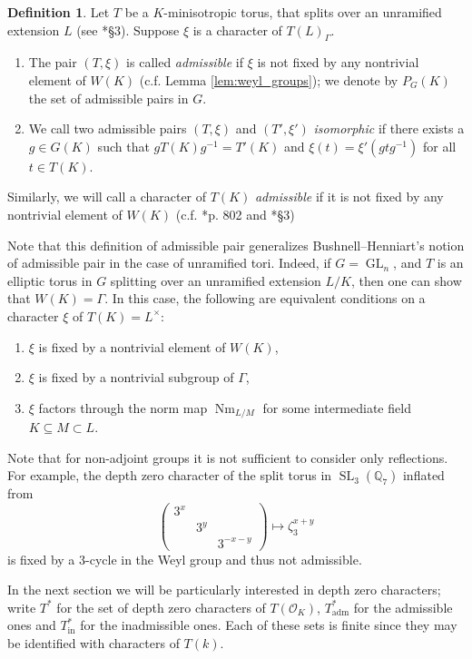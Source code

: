 \documentclass{mrlart7}
\theoremstyle{plain}
\theoremstyle{definition}
\newtheorem{definition}[theorem]{Definition}
\numberwithin{equation}{section}
\DeclareMathOperator{\Nm}{Nm}
\DeclareMathOperator{\GL}{GL}
\DeclareMathOperator{\SL}{SL}
\newcommand{\OK}{\mathcal{O}_K}
\newcommand{\QQ}{\mathbb{Q}}
\newcommand{\Lx}{L^\times}
\newcommand{\Thadm}{T^*_{\operatorname{adm}}}
\newcommand{\Thinadm}{T^*_{\operatorname{in}}}
\newcommand{\hatT}{T^*}
\begin{document}
\begin{definition} \label{def:admissible}
Let $T$ be a $K$-minisotropic torus, that splits over an unramified
extension $L$ (see \cite{reeder:08a}*{\S3}).  Suppose $\xi$ is a character of $T(L)_{\Gamma}$.
\begin{enumerate}
\item The pair $(T, \xi)$ is called \emph{admissible} if $\xi$ is not fixed
by any nontrivial element of $W(K)$ (c.f. Lemma \ref{lem:weyl_groups}); we
denote by $P_G(K)$ the set of admissible pairs in $G$.
\item We call two admissible pairs $(T, \xi)$ and $(T', \xi')$ \emph{isomorphic} if there
exists a $g \in G(K)$ such that $gT(K)g^{-1} = T'(K)$ and $\xi(t) = \xi'(gtg^{-1})$
for all $t \in T(K)$.
\end{enumerate}
Similarly, we will call a character of $T(K)$ \emph{admissible} if
it is not fixed by any nontrivial element of $W(K)$
(c.f. \cite{reeder-debacker:09a}*{p. 802} and \cite{reeder:08a}*{\S3})
\end{definition}

Note that this definition of admissible pair generalizes
Bushnell--Henniart's notion of admissible pair \cite{bushnell-henniart:10a} in
the case of unramified tori.  Indeed,
if $G = \GL_n$, and $T$ is an elliptic torus in $G$ splitting over
an unramified extension $L/K$, then one can show that
$W(K) = \Gamma$.  In this case, the following are equivalent conditions
on a character $\xi$ of $T(K) = \Lx$:
\begin{enumerate}
\item $\xi$ is fixed by a nontrivial element of $W(K)$,
\item $\xi$ is fixed by a nontrivial subgroup of $\Gamma$,
\item $\xi$ factors through the norm map $\Nm_{L/M}$ for some intermediate field $K \subseteq M \subset L$.
\end{enumerate}

Note that for non-adjoint groups it is not sufficient to consider only reflections.
For example, the depth zero character of the split torus in $\SL_3(\QQ_7)$ inflated from
$$\begin{pmatrix} 3^x & & \\ & 3^y & \\ & & 3^{-x-y} \end{pmatrix} \mapsto \zeta_3^{x + y}$$
is fixed by a 3-cycle in the Weyl group and thus not admissible.

In the next section we will be particularly interested in depth zero characters; write $\hatT$ for the set of
depth zero characters of $T(\OK)$, $\Thadm$ for the admissible
ones and $\Thinadm$ for the inadmissible ones.  Each of these
sets is finite since they may be identified with characters of $T(k)$.
\end{document}
